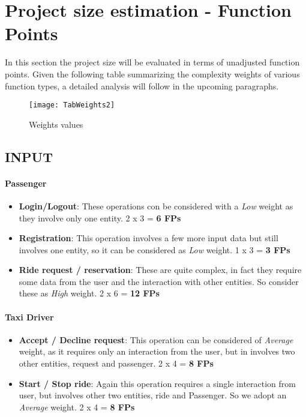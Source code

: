 \section{Project size estimation - Function Points}
In this section the project size will be evaluated in terms of unadjusted function points. Given the following table summarizing the complexity weights of various function types, a detailed analysis will follow in the upcoming paragraphs.\\

\begin{figure}[h!]
        \centering
        \texttt{[image: TabWeights2]}
        \caption{Weights values}
        \label{fig:tw2}
\end{figure}

\subsection{INPUT}
    \paragraph {Passenger}
        \begin{itemize}
            \item \textbf{Login/Logout}: These operations con be considered with a \textit{Low} weight as they involve only one entity. 2 x 3 = \textbf{6 FPs}
            \item \textbf{Registration}: This operation involves a few more input data but still involves one entity, so it can be considered as \textit{Low} weight. 1 x 3 = \textbf{3 FPs}
            \item \textbf{Ride request / reservation}: These are quite complex, in fact they require some data from the user and the interaction with other entities. So consider these as \textit{High} weight. 2 x 6 = \textbf{12 FPs}
        \end{itemize}
    
    \paragraph{Taxi Driver}
        \begin{itemize}
            \item \textbf{Accept / Decline request}: This operation can be considered of \textit{Average} weight, as it requires only an interaction from the user, but in involves two other entities, request and passenger. 2 x 4 = \textbf{8 FPs}
            \item \textbf{Start / Stop ride}: Again this operation requires a single interaction from user, but involves other two entities, ride and Passenger. So we adopt an \textit{Average} weight. 2 x 4 = \textbf{8 FPs}
        \end{itemize}


